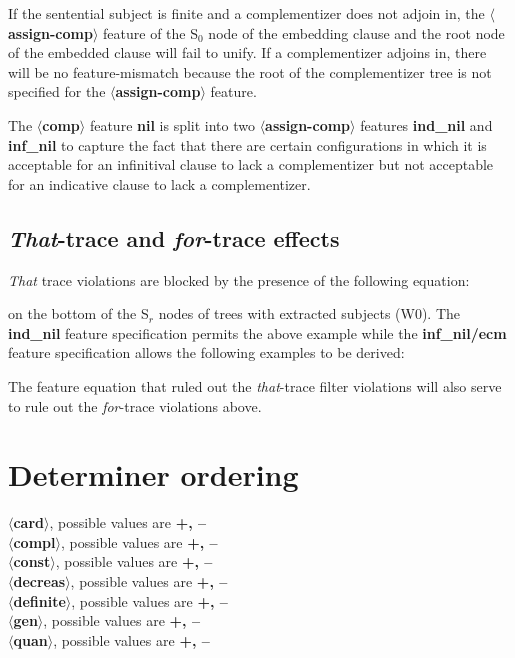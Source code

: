 If the sentential subject is finite and a complementizer does
not adjoin in, the {\bf $\langle$assign-comp$\rangle$} feature of the 
S$_{0}$ node of the embedding clause and the root node of the
embedded clause will fail to unify. If a complementizer adjoins in,
there will be no feature-mismatch because the root of the
complementizer tree is not specified for the {\bf $\langle$assign-comp$\rangle$} feature.

The {\bf $\langle$comp$\rangle$} feature {\bf nil} is split into two
{\bf $\langle$assign-comp$\rangle$} features {\bf ind\_nil} and
{\bf inf\_nil} to capture the fact that there are certain configurations in
which it is acceptable for an infinitival clause to lack a complementizer
but not acceptable for an indicative clause to lack a complementizer. 

\subsection{{\em That}-trace and {\em for}-trace effects}


{\em That} trace violations are blocked by the presence of the following
equation:


on the bottom of the S$_{r}$ nodes of trees with extracted subjects (W0). 
The {\bf ind\_nil} feature specification permits the above example
while the {\bf inf\_nil/ecm} feature specification allows the
following examples to be derived:


The feature equation that ruled out the {\em that}-trace filter violations
will also serve to rule out the {\em for}-trace violations above.

\section{Determiner ordering}
{\bf $\langle$card$\rangle$}, possible values are {\bf +, --}\\
{\bf $\langle$compl$\rangle$}, possible values are {\bf +, --}\\
{\bf $\langle$const$\rangle$}, possible values are {\bf +, --}\\
{\bf $\langle$decreas$\rangle$}, possible values are {\bf +, --}\\
{\bf $\langle$definite$\rangle$}, possible values are {\bf +, --}\\
{\bf $\langle$gen$\rangle$}, possible values are {\bf +, --}\\
{\bf $\langle$quan$\rangle$}, possible values are {\bf +, --}

